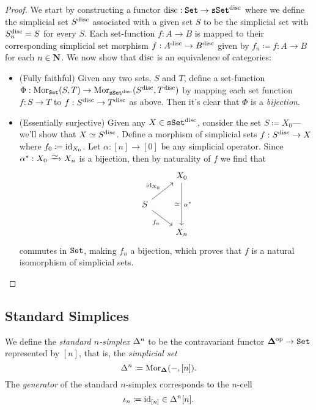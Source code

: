 \begin{proof}
    We start by constructing a functor \(\text{disc}: {\texttt{Set}} \to {\texttt{sSet}}^{\text{disc}}\) where we
    define the simplicial set \(S^{\text{disc}}\) associated with a given set \(S\) to be
    the simplicial set with \(S_n^{\text{disc}} = S\) for every \(S\). Each set-function
    \(f: A \to B\) is mapped to their corresponding simplicial set morphism
    \(f: A^{\text{disc}} \to B^{\text{disc}}\) given by \(f_n \coloneq f: A \to B\) for each
    \(n \in \mathbf{N}\). We now show that \(\text{disc}\) is an equivalence of categories:

    \begin{itemize}\setlength\itemsep{0em}
        \item (Fully faithful) Given any two sets, \(S\) and \(T\), define a
              set-function
              \(\Phi: \operatorname{Mor}_{{\texttt{Set}}}(S, T) \to \operatorname{Mor}_{{\texttt{sSet}}^{\text{disc}}}(S^{\text{disc}}, T^{\text{disc}})\) by
              mapping each set function \(f: S \to T\) to \(f: S^{\text{disc}} \to T^{\text{disc}}\) as
              above. Then it's clear that \(\Phi\) is a \emph{bijection}.

        \item (Essentially surjective) Given any \(X \in {\texttt{sSet}}^{\text{disc}}\), consider the
              set \(S \coloneq X_0\)---we'll show that \(X \simeq S^{\text{disc}}\). Define a
              morphism of simplicial sets \(f: S^{\text{disc}} \to X\) where \(f_0 \coloneq
              \operatorname{id}_{X_0}\). Let \(\alpha: [n] \to [0]\) be any simplicial operator. Since
              \(\alpha^{*}: X_0 \isoto X_n\) is a bijection, then by naturality of \(f\) we
              find that
              \[
                  \begin{tikzcd}
                      &X_0 \ar[dd, "\dis"', "\alpha^{*}"]
                      \\
                      S \ar[ru, "\Id_{X_0}"] \ar[rd, "f_n"'] &
                      \\
                      &X_n
                  \end{tikzcd}
              \]
              commutes in \({\texttt{Set}}\), making \(f_n\) a bijection, which proves that \(f\) is a
              natural isomorphism of simplicial sets.
    \end{itemize}
\end{proof}

\subsection{Standard Simplices}

\begin{definition}
    \label{def:standard-n-simplex}
    We define the \emph{standard \(n\)-simplex} \(\Delta^n\) to be the contravariant
    functor \({\mathbf{\Delta}}^{\mathrm{op}} \to {\texttt{Set}}\) represented by \([n]\), that is, the
    \emph{simplicial set}
    \[
        \Delta^n \coloneq \operatorname{Mor}_{{\mathbf{\Delta}}}(-, [n]).
    \]
    The \emph{generator} of the standard \(n\)-simplex corresponds to the \(n\)-cell
    \[
        \iota_n \coloneq \operatorname{id}_{[n]} \in \Delta^n [n].
    \]
\end{definition}

